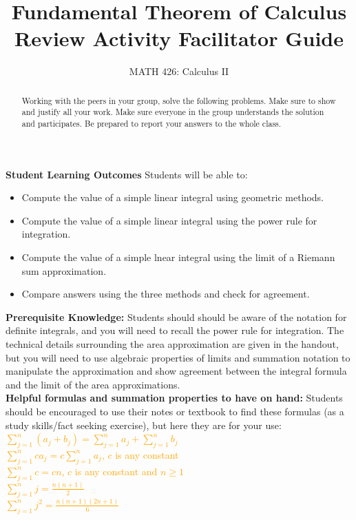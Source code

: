 \documentclass{ximera}
\title{Fundamental Theorem of Calculus Review Activity Facilitator Guide}
\author{MATH 426: Calculus II}
\begin{document}
\begin{abstract}
   Working with the peers in your group, solve the following problems. Make sure to show and justify all your work. Make sure everyone in the group understands the solution and participates. Be prepared to report your answers to the whole class. 
\end{abstract}
\maketitle

\textbf{Student Learning Outcomes}
Students will be able to:
    \begin{itemize}
        \item Compute the value of a simple linear integral using geometric methods.
        \item Compute the value of a simple linear integral using the power rule for integration.
        \item Compute the value of a simple lnear integral using the limit of a Riemann sum approximation.
        \item Compare answers using the three methods and check for agreement.
    \end{itemize}
\textbf{Prerequisite Knowledge:} Students should should be aware of the notation for definite integrals, and you will need to recall the power rule for integration. The technical details surrounding the area approximation are given in the handout, but you will need to use algebraic properties of limits and summation notation to manipulate the approximation and show agreement between the integral formula and the limit of the area approximations.\\
\textbf{Helpful formulas and summation properties to have on hand:} Students should be encouraged to use their notes or textbook to find these formulas (as a study skills/fact seeking exercise), but here they are for your use: \\
\textcolor{orange}{$\displaystyle\sum_{j=1}^n(a_j+b_j)=\sum_{j=1}^n a_j+\sum_{j=1}^n b_j$}\\

\textcolor{orange}{$\displaystyle \sum_{j=1}^n ca_j=c\sum_{j=1}^n a_j$, $c$ is any constant}\\
\textcolor{orange}{$\displaystyle \sum_{j=1}^n c=cn$, $c$ is any constant and $n\geq 1$}\\
\textcolor{orange}{$\displaystyle \sum_{j=1}^n j=\frac{n(n+1)}{2}$}\\
\textcolor{orange}{$\displaystyle \sum_{j=1}^n j^2 =\frac{n(n+1)(2n+1)}{6}$}\\
\end{document}

